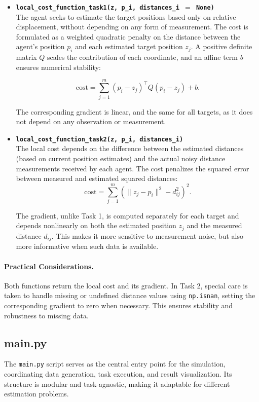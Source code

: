 \begin{itemize}
    \item \textbf{\texttt{local\_cost\_function\_task1(z, p\_i, distances\_i $=$ None)}} \\
The agent seeks to estimate the target positions based only on relative displacement, without depending on any form of measurement. The cost is formulated as a weighted quadratic 
penalty on the distance between the agent's position \( p_i \) and each estimated target position \( z_j \). A positive definite matrix \( Q \) scales the contribution of each 
coordinate, and an affine term \( b \) ensures numerical stability:
    
    \[\text{cost} = \sum_{j=1}^{m} (p_i - z_j)^\top Q (p_i - z_j) + b.\]
  
    The corresponding gradient is linear, and the same for all targets, as it does not depend on any observation or measurement.

    \item \textbf{\texttt{local\_cost\_function\_task2(z, p\_i, distances\_i)}} \\
    The local cost depends on the difference between the estimated distances (based on current position estimates) and the actual noisy distance measurements received by each agent.
    The cost penalizes the squared error between measured and estimated squared distances:
    \[ \text{cost} = \sum_{j=1}^{m} \left( \| z_j - p_i \|^2 - d_{ij}^2 \right)^2. \]

    The gradient, unlike Task 1, is computed separately for each target and depends nonlinearly on both the estimated position \( z_j \) and the measured distance \( d_{ij} \). 
    This makes it more sensitive to measurement noise, but also more informative when such data is available.
\end{itemize}



\paragraph{Practical Considerations.}
Both functions return the local cost and its gradient. In Task 2, special care is taken to handle missing or undefined distance values using \texttt{np.isnan}, setting the 
corresponding gradient to zero when necessary. This ensures stability and robustness to missing data.

\subsection*{\textbf{main.py}}
The \texttt{main.py} script serves as the central entry point for the simulation, coordinating data generation, task execution, and result visualization. Its structure is 
modular and task-agnostic, making it adaptable for different estimation problems.


